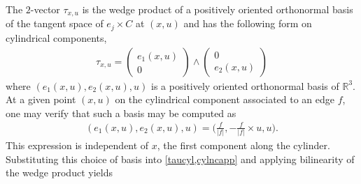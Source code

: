 \documentclass[sn-mathphys-num]{sn-jnl}%
\theoremstyle{thmstyleone}%
\theoremstyle{thmstyletwo}%
\theoremstyle{thmstylethree}%
\numberwithin{remark}{section}
\numberwithin{definition}{section}
\numberwithin{equation}{section}
\numberwithin{theorem}{section}
\newcommand{\R}{\ensuremath{\mathbb{R}}}%
\begin{document}
The $2$-vector $\tau_{x,u}$ is the wedge product of a positively oriented orthonormal basis of the tangent space of $e_j\times C$ at $(x,u)$ and has the following form \cite{NCpaper} on cylindrical components,
\begin{align}\label{taucyl}
    \tau_{x,u} = \begin{pmatrix}  e_1(x,u) \\ 0  \end{pmatrix}\wedge  \begin{pmatrix} 0\\ e_2(x,u) \end{pmatrix}
\end{align}
 where $(e_{1}(x,u),e_{2}(x,u),u)$ is a positively oriented orthonormal basis of $\R^{3}$. At a given point $(x,u)$ on the cylindrical component associated to an edge $f$, one may verify that such a basis may be computed as 
\begin{align*}
(e_{1}(x,u),e_{2}(x,u),u) = \bigg(\frac{f }{\lvert f \rvert},-\frac{f }{\lvert f \rvert} \times u ,u\bigg).
\end{align*}
This expression is independent of $x$, the first component along the cylinder. Substituting this choice of basis into \cref{taucyl,cylncapp} and applying bilinearity of the wedge product yields
\end{document}
